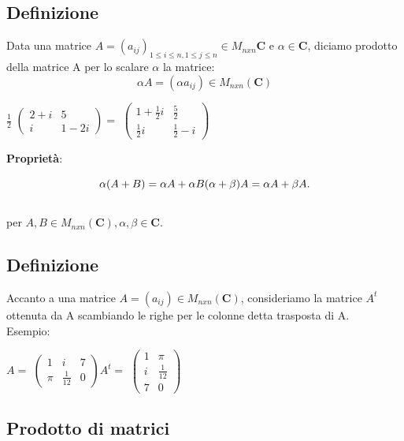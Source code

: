 \documentclass[12pt]{article}
\begin{document}
\subsection{Definizione}

Data una matrice  $A = (a_{ij})_{1 \le i \le n, 1 \le j \le n} \in M_{nxn} \mathbf{C}$ e $\alpha \in \mathbf{C}$, diciamo prodotto della matrice A per lo scalare $\alpha$ la matrice:
\[
\alpha A = (\alpha a_{ij}) \in M_{nxn} (\mathbf{C})
\]

\begin{center}
$\frac{1}{2}$
$\begin{pmatrix}
  2+i & 5\\
  i & 1-2i
\end{pmatrix} =$
$\begin{pmatrix}
    1+\frac{1}{2}i & \frac{5}{2}\\
    \frac{1}{2}i & \frac{1}{2} - i
\end{pmatrix}$
\end{center}
\textbf{Proprietà}:

\[\alpha(A+B) = \alpha A + \alpha B\\(\alpha + \beta)A = \alpha A + \beta A.\]
\\per $A, B \in M_{nxn} (\mathbf{C}), \alpha, \beta \in \mathbf{C}.$

\subsection{Definizione}

Accanto a una matrice $A = (a_{ij}) \in M_{nxn} (\mathbf{C})$, consideriamo la matrice $A^t$ ottenuta da A scambiando le righe per le colonne detta trasposta di A.
\\
Esempio:

\begin{center}
$A =$
$\begin{pmatrix}
  1 & i & 7\\
  \pi & \frac{1}{12} & 0
\end{pmatrix} A^t = $
$\begin{pmatrix}
    1 & \pi\\
    i & \frac{1}{12}\\
    7 & 0
\end{pmatrix}$
\end{center}

\subsection{Prodotto di matrici}
\end{document}
